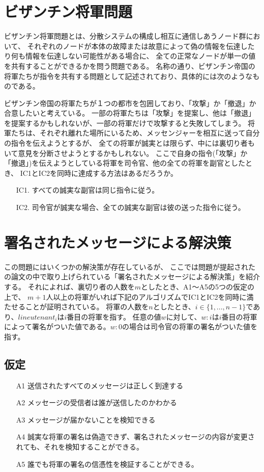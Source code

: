 \section{ビザンチン将軍問題}
ビザンチン将軍問題とは、分散システムの構成し相互に通信しあうノード群において、
それぞれのノードが本体の故障または故意によって偽の情報を伝達したり何も情報を伝達しない可能性がある場合に、
全ての正常なノードが単一の値を共有することができるかを問う問題である。\cite{lamport1982}
名称の通り、ビザンチン帝国の将軍たちが指令を共有する問題として記述されており、具体的には次のようなものである。

ビザンチン帝国の将軍たちが１つの都市を包囲しており、「攻撃」か「撤退」か合意したいと考えている。
一部の将軍たちは「攻撃」を提案し、他は「撤退」を提案するかもしれないが、一部の将軍だけで攻撃すると失敗してしまう。
将軍たちは、それぞれ離れた場所にいるため、メッセンジャーを相互に送って自分の指令を伝えようとするが、
全ての将軍が誠実とは限らず、中には裏切り者もいて意見を分断させようとするかもしれない。
ここで自身の指令(「攻撃」か「撤退」)を伝えようとしている将軍を司令官、他の全ての将軍を副官としたとき、
IC1とIC2を同時に達成する方法はあるだろうか。

\begin{itemize}
  \item[IC1.] すべての誠実な副官は同じ指令に従う。
  \item[IC2.] 司令官が誠実な場合、全ての誠実な副官は彼の送った指令に従う。
\end{itemize}

\section{署名されたメッセージによる解決策}
この問題にはいくつかの解決策が存在しているが、
ここでは問題が提起されたの論文の中で取り上げられている「署名されたメッセージによる解決策」を紹介する。
それによれば、裏切り者の人数を$m$としたとき、A1〜A5の5つの仮定の上で、
$m+1$人以上の将軍がいれば下記のアルゴリズムでIC1とIC2を同時に満たせることが証明されている。
将軍の人数を$n$としたとき、$i \in \{1,...,n-1\}$であり、$lineutenant_i$は$i$番目の将軍を指す。
任意の値$w$に対して、$w:i$は$i$番目の将軍によって署名がついた値である。$w:0$の場合は司令官の将軍の署名がついた値を指す。

\subsection{仮定}
\begin{itemize}
  \item[A1] 送信されたすべてのメッセージは正しく到達する
  \item[A2] メッセージの受信者は誰が送信したのかわかる
  \item[A3] メッセージが届かないことを検知できる
  \item[A4] 誠実な将軍の署名は偽造できず、署名されたメッセージの内容が変更されても、それを検知することができる。
  \item[A5] 誰でも将軍の署名の信憑性を検証することができる。
\end{itemize}

